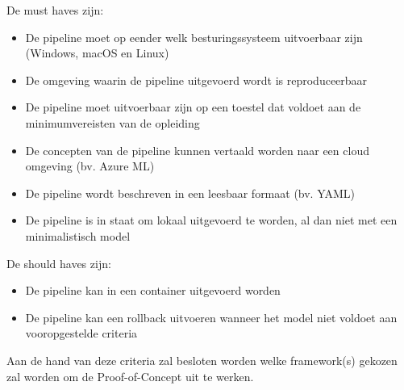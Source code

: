 De must haves zijn:
\begin{itemize}
    \item De pipeline moet op eender welk besturingssysteem uitvoerbaar zijn (Windows, macOS en Linux)
    \item De omgeving waarin de pipeline uitgevoerd wordt is reproduceerbaar
    \item De pipeline moet uitvoerbaar zijn op een toestel dat voldoet aan de minimumvereisten van de opleiding
    \item De concepten van de pipeline kunnen vertaald worden naar een cloud omgeving (bv. Azure ML)
    \item De pipeline wordt beschreven in een leesbaar formaat (bv. YAML)
    \item De pipeline is in staat om lokaal uitgevoerd te worden, al dan niet met een minimalistisch model
\end{itemize}
De should haves zijn:
\begin{itemize}
    \item De pipeline kan in een container uitgevoerd worden
    \item De pipeline kan een rollback uitvoeren wanneer het model niet voldoet aan vooropgestelde criteria
\end{itemize}

Aan de hand van deze criteria zal besloten worden welke framework(s) gekozen zal worden om de Proof-of-Concept uit te werken.


